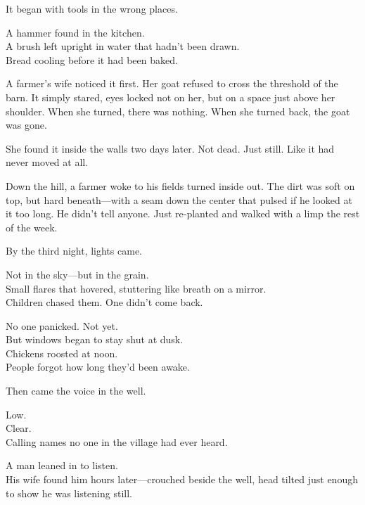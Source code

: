 \documentclass[12pt]{article}
\begin{document}
It began with tools in the wrong places.

\vspace{0.5em}
A hammer found in the kitchen.\\
A brush left upright in water that hadn’t been drawn.\\
Bread cooling before it had been baked.

\vspace{0.5em}
A farmer's wife noticed it first. Her goat refused to cross the threshold of the barn. It simply stared, eyes locked not on her, but on a space just above her shoulder. When she turned, there was nothing. When she turned back, the goat was gone.

\vspace{0.5em}
She found it inside the walls two days later. Not dead. Just still. Like it had never moved at all.

\vspace{0.5em}
Down the hill, a farmer woke to his fields turned inside out. The dirt was soft on top, but hard beneath---with a seam down the center that pulsed if he looked at it too long. He didn’t tell anyone. Just re-planted and walked with a limp the rest of the week.

\vspace{0.5em}
By the third night, lights came.

\vspace{0.5em}
Not in the sky---but in the grain.\\
Small flares that hovered, stuttering like breath on a mirror.\\
Children chased them. One didn’t come back.

\vspace{0.5em}
No one panicked. Not yet.\\
But windows began to stay shut at dusk.\\
Chickens roosted at noon.\\
People forgot how long they’d been awake.

\vspace{0.5em}
Then came the voice in the well.

\vspace{0.5em}
Low.\\
Clear.\\
Calling names no one in the village had ever heard.

\vspace{0.5em}
A man leaned in to listen.\\
His wife found him hours later---crouched beside the well, head tilted just enough to show he was listening still.
\end{document}
